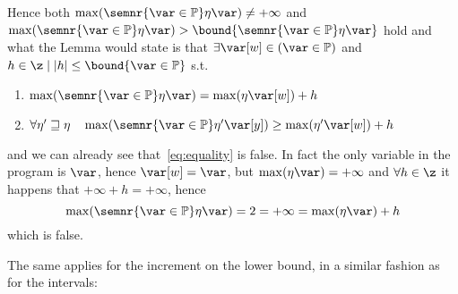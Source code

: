 \begin{remark}
  \noindent
  Hence both
  \(\max({\semnr{\var\in\mathbb{P}}\eta\var}) \neq +\infty\) and
  \(\max({\semnr{\var\in\mathbb{P}}\eta\var}) >
  \bound{\semnr{\var\in\mathbb{P}}\eta\var}\) hold and what the Lemma
  would state is that \(\exists \var[w] \in (\var\in \mathbb{P})\) and
  \(h \in \z \mid |h| \leq \bound{\var\in\mathbb{P}}\) s.t.
  \begin{enumerate}[label=(\roman*)]
  \item\label{eq:equality}
    \(\max(\semnr{\var\in \mathbb{P}}\eta\var) = \max(\eta\var[w]) +
    h\)
  \item
    \(\forall \eta'\sqsupseteq \eta \quad
    \max(\semnr{\var\in\mathbb{P}}\eta'\var[y]) \geq
    \max(\eta'\var[w]) + h\)
  \end{enumerate}
  and we can already see that~\ref{eq:equality} is false. In fact the
  only variable in the program is \(\var\), hence \(\var[w] = \var\),
  but \(\max(\eta\var) = +\infty\) and \(\forall h \in \z\) it happens
  that \(+\infty + h = +\infty\), hence
  \begin{equation*}
    \max(\semnr{\var\in\mathbb{P}}\eta\var) = 2 = +\infty = \max(\eta\var) + h
  \end{equation*}
  which is false.
\end{remark}

The same applies for the increment on the lower bound, in a similar
fashion as for the intervals:

